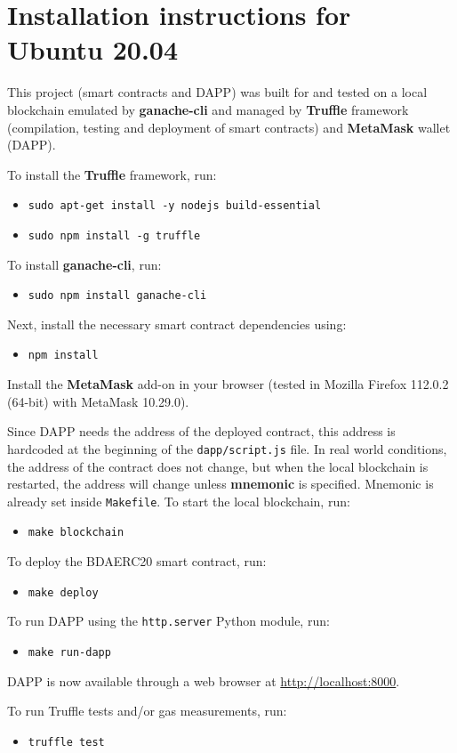 \documentclass[12pt]{article}
\begin{document}
\section{Installation instructions for Ubuntu 20.04}
This project (smart contracts and DAPP) was built for and tested on a local blockchain emulated by \textbf{ganache-cli} and managed by \textbf{Truffle} framework (compilation, testing and deployment of smart contracts) and \textbf{MetaMask} wallet (DAPP).

To install the \textbf{Truffle} framework, run:
\begin{itemize}
    \item[] \texttt{sudo apt-get install -y nodejs build-essential}
    \item[] \texttt{sudo npm install -g truffle}
\end{itemize}

To install \textbf{ganache-cli}, run:
\begin{itemize}
    \item[] \texttt{sudo npm install ganache-cli}
\end{itemize}

Next, install the necessary smart contract dependencies using:
\begin{itemize}
    \item[] \texttt{npm install}
\end{itemize}

Install the \textbf{MetaMask} add-on in your browser (tested in Mozilla Firefox 112.0.2 (64-bit) with MetaMask 10.29.0).

Since DAPP needs the address of the deployed contract, this address is hardcoded at the beginning of the \texttt{dapp/script.js} file. In real world conditions, the address of the contract does not change, but when the local blockchain is restarted, the address will change unless \textbf{mnemonic} is specified. Mnemonic is already set inside \texttt{Makefile}. To start the local blockchain, run:
\begin{itemize}
    \item[] \texttt{make blockchain}
\end{itemize}

To deploy the BDAERC20 smart contract, run:
\begin{itemize}
    \item[] \texttt{make deploy}
\end{itemize}

To run DAPP using the \texttt{http.server} Python module, run:
\begin{itemize}
    \item[] \texttt{make run-dapp}
\end{itemize}

DAPP is now available through a web browser at \url{http://localhost:8000}.

To run Truffle tests and/or gas measurements, run:
\begin{itemize}
    \item[] \texttt{truffle test}
\end{itemize}


\newpage
 

\end{document}
